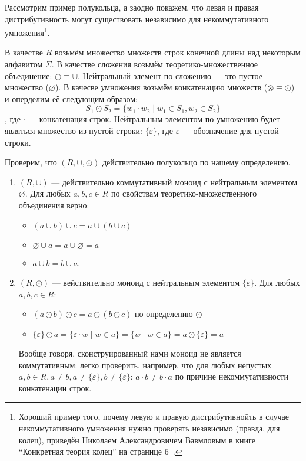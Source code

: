 \begin{example}
Рассмотрим пример полукольца, а заодно покажем, что левая и правая дистрибутивность могут существовать независимо для некоммутативного умножения\footnote{Хороший пример того, почему левую и правую дистрибутивнойть в случае некоммутативного умножения нужно проверять независимо (правда, для колец), приведён Николаем Александровичем Вавмловым в книге ``Конкретная теория колец'' на странице 6~\cite{VavilovRings}.}.

В качестве $R$ возьмём множество множеств строк конечной длины над некоторым алфавитом $\Sigma$. В качестве сложения возьмём теоретико-множественное объединение: $\oplus  \equiv \cup$. Нейтральный элемент по сложению --- это пустое множество ($\varnothing$).
В качесве умножения возьмём конкатенацию множеств ($\otimes  \equiv \odot$) и оперделим её следующим образом:
$$ S_1 \odot S_2 = \{ w_1 \cdot w_2 \mid w_1 \in S_1, w_2 \in S_2\}$$, где $\cdot$ --- конкатенация строк. Нейтральным элементом по умножению будет являться множество из пустой строки: $\{\varepsilon\}$, где $\varepsilon$ --- обозначение для пустой строки.

Проверим, что $(R, \cup, \odot)$ действительно полукольцо по нашему определению.

\begin{enumerate}

\item $(R, \cup)$ --- действительно коммутативный моноид с нейтральным элементом $\varnothing$. Для любых $a,b,c \in R$ по свойствам теоретико-множественного объединения верно:
\begin{itemize}
	\item $(a \cup b) \cup c = a \cup (b \cup c)$
	\item $\varnothing \cup a = a \cup \varnothing = a$
	\item $a \cup b = b \cup a$.
\end{itemize}

\item $(R, \odot)$ --- вействительно моноид с нейтральным элементом $\{\varepsilon\}$. Для любых $a,b,c \in R$:
\begin{itemize}
	\item $(a \odot b) \odot c = a \odot (b \odot c)$ по определению $\odot$
    \item $\{\varepsilon\} \odot a = \{\varepsilon \cdot w \mid w \in a \} = \{w \mid w \in a \} = a \odot \{\varepsilon\} = a$
\end{itemize}
Вообще говоря, сконструированный нами моноид не является коммутативным: легко проверить, например, что для любых непустых $a,b \in R, a \neq b, a \neq \{\varepsilon\}, b \neq \{\varepsilon\}$: $a \cdot b \neq b \cdot a$ по причине некоммутативности конкатенации строк.


\end{enumerate}
\end{example}
